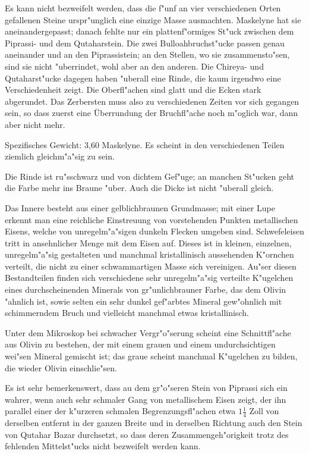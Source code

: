 \documentclass[a4paper, 11pt, oneside]{article}
\begin{document}
Es kann nicht bezweifelt werden, dass die f"unf an vier verschiedenen Orten gefallenen Steine urspr"unglich eine einzige Masse ausmachten. Maskelyne hat sie aneinandergepasst; danach fehlte nur ein plattenf"ormiges St"uck zwischen dem Piprassi- und dem Qutaharstein. Die zwei Bulloahbruchst"ucke passen genau aneinander und an den Piprassistein; an den Stellen, wo sie zusammensto"sen, sind sie nicht "uberrindet, wohl aber an den anderen. Die Chireya- und Qutaharst"ucke dagegen haben "uberall eine Rinde, die kaum irgendwo eine Verschiedenheit zeigt. Die Oberfl"achen sind glatt und die Ecken stark abgerundet. Das Zerbersten muss also zu verschiedenen Zeiten vor sich gegangen sein, so dass zuerst eine Überrundung der Bruchfl"ache noch m"oglich war, dann aber nicht mehr.

Spezifisches Gewicht: 3,60 Maskelyne. Es scheint in den verschiedenen Teilen ziemlich gleichm"a"sig zu sein.

Die Rinde ist ru"sschwarz und von dichtem Gef"uge; an manchen St"ucken geht die Farbe mehr ins Braune "uber. Auch die Dicke ist nicht "uberall gleich.

Das Innere besteht aus einer gelblichbraunen Grundmasse; mit einer Lupe erkennt man eine reichliche Einstreuung von vorstehenden Punkten metallischen Eisens, welche von unregelm"a"sigen dunkeln Flecken umgeben sind. Schwefeleisen tritt in ansehnlicher Menge mit dem Eisen auf. Dieses ist in kleinen, einzelnen, unregelm"a"sig gestalteten und manchmal kristallinisch aussehenden K"ornchen verteilt, die nicht zu einer schwammartigen Masse sich vereinigen. Au"ser diesen Bestandteilen finden sich verschiedene sehr unregelm"a"sig verteilte K"ugelchen eines durchscheinenden Minerals von gr"unlichbrauner Farbe, das dem Olivin "ahnlich ist, sowie selten ein sehr dunkel gef"arbtes Mineral gew"ohnlich mit schimmerndem Bruch und vielleicht manchmal etwas kristallinisch.

Unter dem Mikroskop bei schwacher Vergr"o"serung scheint eine Schnittfl"ache aus Olivin zu bestehen, der mit einem grauen und einem undurchsichtigen wei"sen Mineral gemischt ist; das graue scheint manchmal K"ugelchen zu bilden, die wieder Olivin einschlie"sen.

Es ist sehr bemerkenswert, dass au dem gr"o"seren Stein von Piprassi sich ein wahrer, wenn auch sehr schmaler Gang von metallischem Eisen zeigt, der ihn parallel einer der k"urzeren schmalen Begrenzungsfl"achen etwa $\mathfrak{1\frac{1}{4}}$ Zoll von derselben entfernt in der ganzen Breite und in derselben Richtung auch den Stein von Qutahar Bazar durchsetzt, so dass deren Zusammengeh"origkeit trotz des fehlenden Mittelst"ucks nicht bezweifelt werden kann.
\end{document}
